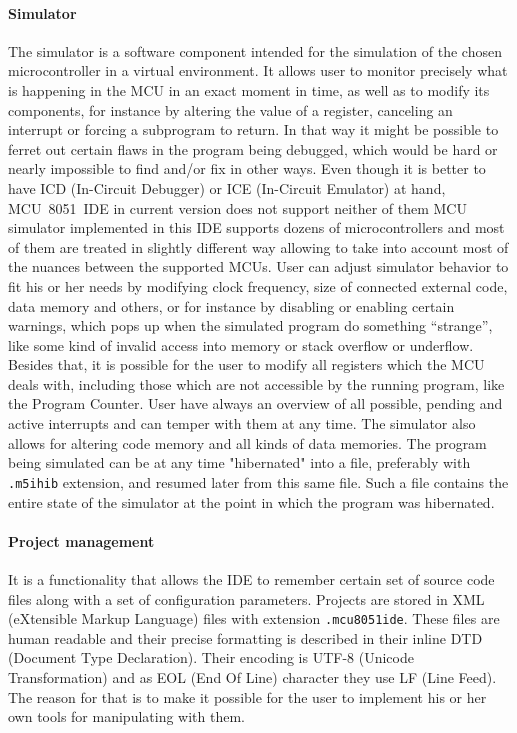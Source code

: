 \documentclass[a4paper,twoside,12pt]{book}
\newcommand{\fileextension}[1]{\texttt{#1}}
\begin{document}
		\paragraph{Simulator} The simulator is a software component intended for the simulation of the chosen microcontroller in a virtual environment. It allows user to monitor precisely what is happening in the MCU in an exact moment in time, as well as to modify its components, for instance by altering the value of a register, canceling an interrupt or forcing a subprogram to return. In that way it might be possible to ferret out certain flaws in the  program being debugged, which would be hard or nearly impossible to find and/or fix in other ways. Even though it is better to have ICD (In-Circuit Debugger) or ICE (In-Circuit Emulator) at hand, MCU~8051~IDE in current version does not support neither of them %
		MCU simulator implemented in this IDE supports dozens of microcontrollers and most of them are treated in slightly different way allowing to take into account most of the nuances between the supported MCUs. User can adjust simulator behavior to fit his or her needs by modifying clock frequency, size of connected external code, data memory and others, or for instance by disabling or enabling certain warnings, which pops up when the simulated program do something ``strange'', like some kind of invalid access into memory or stack overflow or underflow. Besides that, it is possible for the user to modify all registers which the MCU deals with, including those which are not accessible by the running program, like the Program Counter. User have always an overview of all possible, pending and active interrupts and can temper with them at any time. The simulator also allows for altering code memory and all kinds of data memories. The program being simulated can be at any time "hibernated" into a file, preferably with \fileextension{.m5ihib} extension, and resumed later from this same file. Such a file contains the entire state of the simulator at the point in which the program was hibernated.

		\paragraph{Project management} It is a functionality that allows the IDE to remember certain set of source code files along with a set of configuration parameters. Projects are stored in XML (eXtensible Markup Language) files with extension \fileextension{.mcu8051ide}. These files are human readable and their precise formatting is described in their inline DTD (Document Type Declaration). Their encoding is UTF-8 (Unicode Transformation) and as EOL (End Of Line) character they use LF (Line Feed). The reason for that is to make it possible for the user to implement his or her own tools for manipulating with them.
\end{document}
